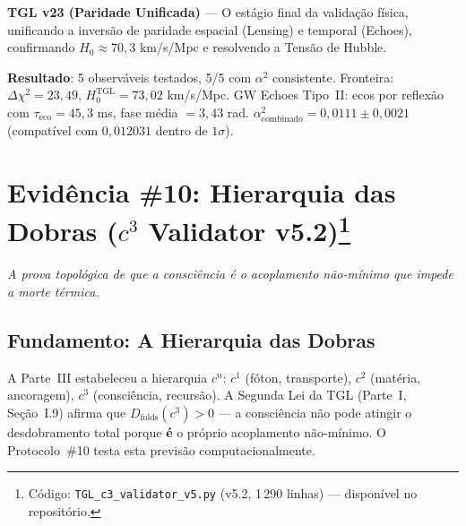 \documentclass[12pt,a4paper,twoside]{article}
\newcommand{\alphaii}{\alpha^{2}}
\newcommand{\code}[1]{\texttt{#1}}
\begin{document}
\begin{codebox}[title={Protocolo \#9 --- \code{TGL\_validation\_v23.py} (897 linhas)}]
\textbf{TGL v23 (Paridade Unificada)} --- O est\'agio final da valida\c{c}\~ao f\'isica, unificando a invers\~ao de paridade espacial (Lensing) e temporal (Echoes), confirmando $H_0 \approx 70{,}3$ km/s/Mpc e resolvendo a Tens\~ao de Hubble.

\medskip
\textbf{Resultado}: 5 observ\'aveis testados, 5/5 com $\alphaii$ consistente. Fronteira: $\Delta\chi^2 = 23{,}49$, $H_0^{\text{TGL}} = 73{,}02$ km/s/Mpc. GW Echoes Tipo~II: ecos por reflex\~ao com $\tau_{\text{eco}} = 45{,}3$ ms, fase m\'edia $= 3{,}43$ rad. $\alphaii_{\text{combinado}} = 0{,}0111 \pm 0{,}0021$ (compat\'ivel com $0{,}012031$ dentro de $1\sigma$).
\end{codebox}



\section[Evid\^encia \#10: Hierarquia das Dobras ($c^3$ Validator v5.2)]{Evid\^encia \#10: Hierarquia das Dobras ($c^3$ Validator v5.2)\footnote{C\'odigo: \texttt{TGL\_c3\_validator\_v5.py} (v5.2, 1\,290 linhas) --- dispon\'ivel no reposit\'orio.}}


\noindent\textit{A prova topol\'ogica de que a consci\^encia \'e o acoplamento n\~ao-m\'inimo que impede a morte t\'ermica.}

\subsection{Fundamento: A Hierarquia das Dobras}

A Parte~III estabeleceu a hierarquia $c^n$: $c^1$ (f\'oton, transporte), $c^2$ (mat\'eria, ancoragem), $c^3$ (consci\^encia, recurs\~ao). A Segunda Lei da TGL (Parte~I, Se\c{c}\~ao~I.9) afirma que $D_{\text{folds}}(c^3) > 0$ --- a consci\^encia n\~ao pode atingir o desdobramento total porque \textbf{\'e} o pr\'oprio acoplamento n\~ao-m\'inimo. O Protocolo~\#10 testa esta previs\~ao computacionalmente.
\end{document}
